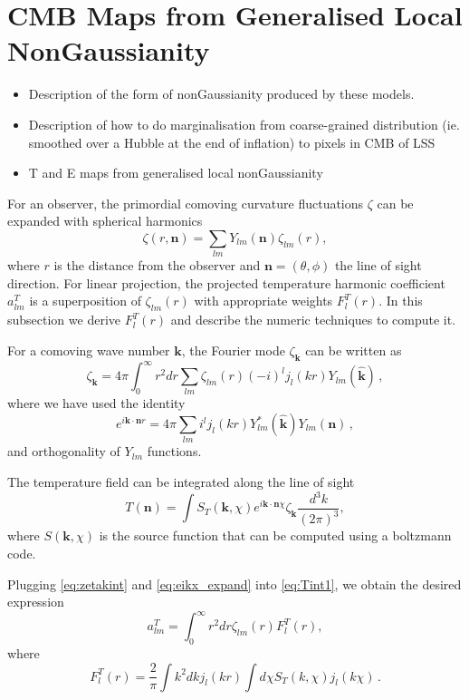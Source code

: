 \section{CMB Maps from Generalised Local NonGaussianity}
\begin{itemize}
\item Description of the form of nonGaussianity produced by these models.
\item Description of how to do marginalisation from coarse-grained distribution (ie. smoothed over a Hubble at the end of inflation) to pixels in CMB of LSS
\item T and E maps from generalised local nonGaussianity
\end{itemize}

For an observer,  the primordial comoving curvature fluctuations  $\zeta$ can be expanded with spherical harmonics
\begin{equation}
  \zeta(r, \mathbf{n}) = \sum_{lm} Y_{lm}(\mathbf{n})\zeta_{lm}(r),
\end{equation}
where $r$ is the distance from the observer and $\mathbf{n} = (\theta, \phi)$ the line of sight direction. For linear projection, the projected temperature harmonic coefficient $a_{lm}^T$ is a superposition of $\zeta_{lm}(r)$ with appropriate weights $F_l^T(r)$. In this subsection we derive $F_l^T(r)$ and describe the numeric techniques to compute it.

 For a comoving wave number $\mathbf{k}$, the Fourier mode $\zeta_{\mathbf{k}}$ can be written as
\begin{equation}
  \zeta_{\mathbf{k}} = 4\pi \int_0^\infty r^2dr\sum_{lm}\zeta_{lm}(r) (-i)^l j_l(kr) Y_{lm}(\hat{\mathbf{k}})\, , \label{eq:zetakint}
\end{equation}
where we have used the identity
\begin{equation}
  e^{i\mathbf{k}\cdot\mathbf{n}r} = 4\pi \sum_{lm}i^l j_l(kr) Y^*_{lm}(\hat{\mathbf{k}}) Y_{lm}(\mathbf{n}) \, , \label{eq:eikx_expand}
\end{equation}
and orthogonality of $Y_{lm}$ functions.


The temperature field can be integrated along the line of sight
\begin{equation}
T({\mathbf{n}}) = \int S_T(\mathbf{k}, \chi) e^{i \mathbf{k}\cdot\mathbf{n} \chi}\zeta_{\mathbf{k}}\frac{d^3k}{(2\pi)^3}, \label{eq:Tint1}
\end{equation}
where $S(\mathbf{k}, \chi)$ is the source function that can be computed using a boltzmann code.

Plugging \eqref{eq:zetakint} and \eqref{eq:eikx_expand} into \eqref{eq:Tint1}, we obtain the desired expression
\begin{equation}
a_{lm}^T = \int_0^\infty r^2dr \zeta_{lm}(r) F^T_l(r),
\end{equation}
where
\begin{equation}
F^T_l(r) = \frac{2}{\pi} \int k^2dk j_l(kr) \int d\chi S_T(k, \chi) j_l(k\chi) \, .
\end{equation}
